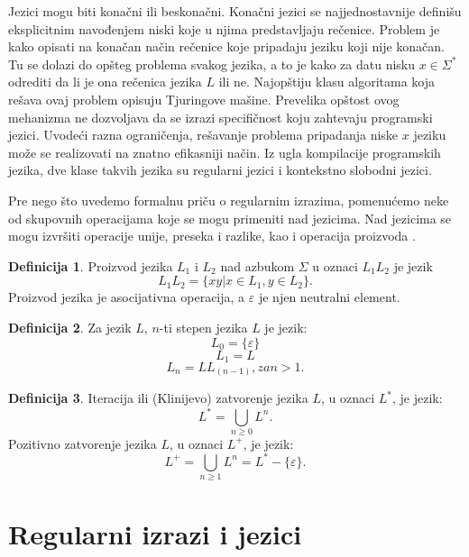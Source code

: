 \documentclass[12pt,oneside]{memoir}
\theoremstyle{plain}
\theoremstyle{definition}
\newtheorem{defn}{Definicija} %
\begin{document}
Jezici mogu biti konačni ili beskonačni. Konačni jezici se najjednostavnije definišu eksplicitnim navođenjem niski koje u njima predstavljaju rečenice. Problem je kako opisati na konačan način rečenice koje pripadaju jeziku koji nije konačan. Tu se dolazi do opšteg problema svakog jezika, a to je kako za datu nisku $x \in \Sigma^*$ odrediti da li je ona rečenica jezika $L$ ili ne. Najopštiju klasu algoritama koja rešava ovaj problem opisuju Tjuringove mašine. Prevelika opštost ovog mehanizma ne dozvoljava da se izrazi specifičnost koju zahtevaju programski  jezici. Uvodeći razna ograničenja, rešavanje problema pripadanja niske $x$ jeziku može se realizovati na znatno efikasniji način. Iz ugla kompilacije programskih jezika, dve klase takvih jezika su regularni jezici i kontekstno slobodni jezici.  

Pre nego što uvedemo formalnu priču o regularnim izrazima, pomenućemo neke od skupovnih operacijama koje se mogu primeniti nad jezicima. Nad jezicima se mogu izvršiti operacije unije, preseka i razlike, kao i operacija proizvoda \cite{Vitas}. 

\begin{defn}
Proizvod jezika $L_1$ i $L_2$ nad azbukom $\Sigma$ u oznaci $L_1L_2$ je jezik $$L_1L_2 = \{xy | x \in L_1, y \in L_2\}.$$
Proizvod jezika je asocijativna operacija, a {$\varepsilon$} je njen neutralni element.
\end{defn}

\begin{defn}
Za jezik $L$, $n$-ti stepen jezika $L$ je jezik: 
$$L_0 = \{ \varepsilon\} $$ 
$$L_1 = L$$
$$L_n = LL_(n-1), za  n>1.$$
\end{defn}

\begin{defn}
Iteracija ili (Klinijevo) zatvorenje jezika $L$, u oznaci $L^*$, je jezik:
$$ L^* = \bigcup_{n\geq0}L^n.$$
Pozitivno zatvorenje jezika $L$, u oznaci $L^+$, je jezik:
$$ L^+ = \bigcup_{n\geq1}L^n = L^* - \{\varepsilon\}.$$
\end{defn}

\section{Regularni izrazi i jezici}
\end{document}
